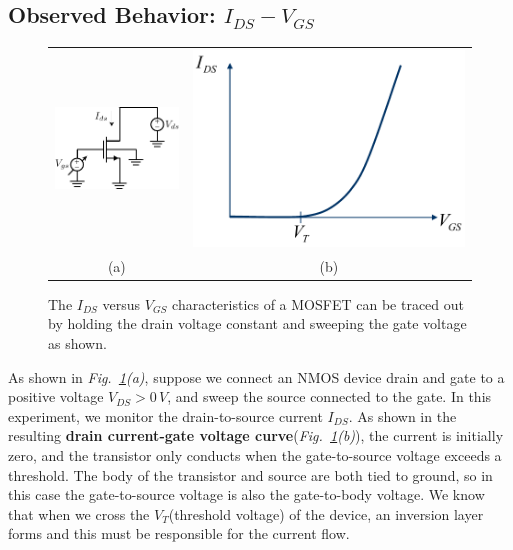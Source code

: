 \subsection{Observed Behavior: \texorpdfstring{$I_{DS}-V_{GS}$}{Drain Current vs. Gate Voltage}}
\begin{figure}[tb]
\centering
\begin{tabular}{cc}
\includegraphics[width=.4\columnwidth]{idvgs_sweep} &
\includegraphics[width=.5\columnwidth]{mos_ids_vgs}\\
(a) & (b)\\
\end{tabular}
\caption{The $I_{DS}$ versus $V_{GS}$ characteristics of a MOSFET can be traced out by holding the drain voltage constant and sweeping the gate voltage as shown.}
\label{fig:idvgs_sweep}
\end{figure}
As shown in \emph{Fig.~\ref{fig:idvgs_sweep}(a)}, suppose we connect an NMOS device drain and gate to a positive voltage $V_{DS} > 0\,V$, and sweep the source connected to the gate.  In this experiment, we monitor the drain-to-source current $I_{DS}$.  As shown in the resulting \textbf{drain current-gate voltage curve}\big(\emph{Fig.~\ref{fig:idvgs_sweep}(b)}\big), the current is initially zero, and the transistor only conducts when the gate-to-source voltage exceeds a threshold.  The body of the transistor and source are both tied to ground, so in this case the gate-to-source voltage is also the gate-to-body voltage.  We know that when we cross the $V_T$(threshold voltage) of the device, an inversion layer forms and this must be responsible for the current flow.

